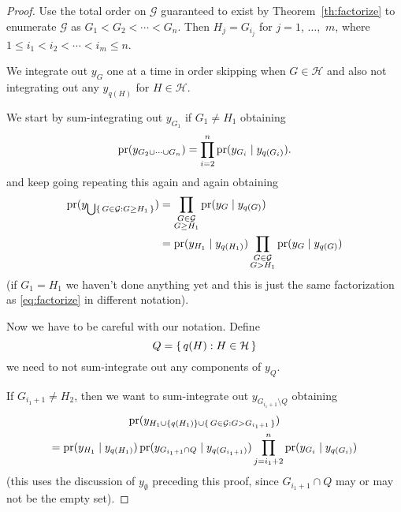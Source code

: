 \begin{proof}
Use the total order on $\mathcal{G}$ guaranteed
to exist by Theorem~\ref{th:factorize}
to enumerate $\mathcal{G}$ as $G_1 < G_2 < \cdots < G_n$.
Then $H_j = G_{i_j}$ for $j = 1$, $\ldots,$ $m$,
where $1 \le i_1 < i_2 < \cdots < i_m \le n$.

We integrate out $y_G$ one at a time
in order skipping when $G \in \mathcal{H}$ and also not integrating out
any $y_{q(H)}$ for $H \in \mathcal{H}$.

We start by sum-integrating out $y_{G_1}$ if $G_1 \neq H_1$ obtaining
$$
   \operatorname{pr}(y_{G_2 \cup \cdots \cup G_n})
   =
   \prod_{i = 2}^n \operatorname{pr}(y_{G_i} \mid y_{q(G_i)}).
$$
and keep going repeating this again and again obtaining
\begin{align*}
   \operatorname{pr}(y_{\bigcup \{\, G \in \mathcal{G} : G \ge H_1 \,\}})
   & =
   \prod_{\substack{G \in \mathcal{G} \\ G \ge H_1}}
   \operatorname{pr}(y_G \mid y_{q(G)})
   \\
   & =
   \operatorname{pr}(y_{H_1} \mid y_{q(H_1)})
   \prod_{\substack{G \in \mathcal{G} \\ G > H_1}}
   \operatorname{pr}(y_G \mid y_{q(G)})
\end{align*}
(if $G_1 = H_1$ we haven't done anything yet and this is just the same
factorization as \eqref{eq:factorize} in different notation).

Now we have to be careful with our notation.  Define
$$
   Q = \{\,  q(H) : H \in \mathcal{H}  \,\}
$$
we need to not sum-integrate out any components of $y_Q$.

If $G_{i_1 + 1} \neq H_2$, then we want to sum-integrate out
$y_{G_{i_1 + 1} \setminus Q}$ obtaining
\begin{multline*}
   \operatorname{pr}(y_{H_1 \cup \{q(H_1)\} \cup \{\, G \in \mathcal{G} : G > G_{i_1 + 1} \,\}})
   \\
   =
   \operatorname{pr}(y_{H_1} \mid y_{q(H_1)})
   \operatorname{pr}(y_{G_{i_1 + 1} \cap Q} \mid y_{q(G_{i_1 + 1})})
   \prod_{j = i_1 + 2}^n
   \operatorname{pr}(y_{G_i} \mid y_{q(G_i)})
\end{multline*}
(this uses the discussion of $y_\emptyset$ preceding this proof,
since $G_{i_1 + 1} \cap Q$ may or may not be the empty set).


\end{proof}
